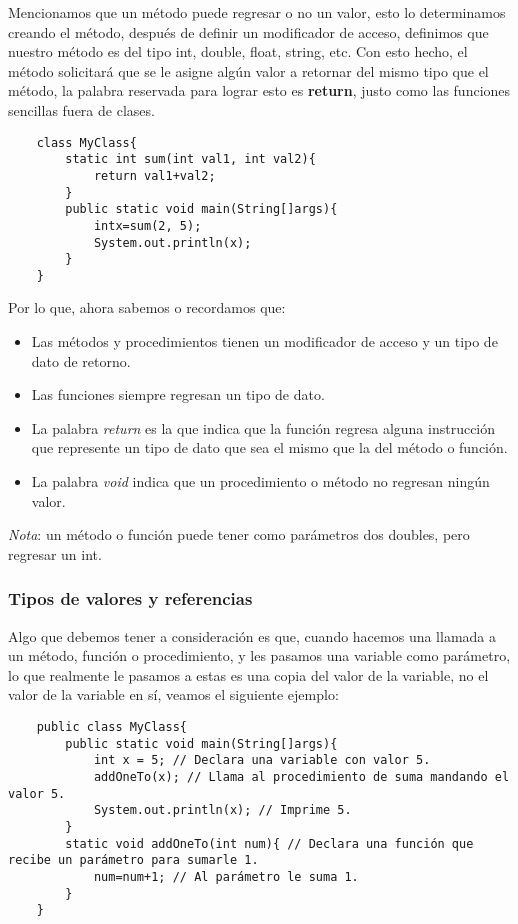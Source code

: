 Mencionamos que un método puede regresar o no un valor, esto lo determinamos creando el método, después de definir un modificador de acceso, definimos que nuestro método es del tipo int, double, float, string, etc. Con esto hecho, el método solicitará que se le asigne algún valor a retornar del mismo tipo que el método, la palabra reservada para lograr esto es \textbf{return}, justo como las funciones sencillas fuera de clases.
\begin{lstlisting}
    class MyClass{
        static int sum(int val1, int val2){
            return val1+val2;
        }
        public static void main(String[]args){
            intx=sum(2, 5);
            System.out.println(x);
        }
    }
\end{lstlisting}

Por lo que, ahora sabemos o recordamos que:
\begin{itemize}
    \item Las métodos y procedimientos tienen un modificador de acceso y un tipo de dato de retorno.
    \item Las funciones siempre regresan un tipo de dato.
    \item La palabra \textit{return} es la que indica que la función regresa alguna instrucción que represente un tipo de dato que sea el mismo que la del método o función.
    \item La palabra \textit{void} indica que un procedimiento o método no regresan ningún valor.
\end{itemize}

\textit{Nota}: un método o función puede tener como parámetros dos doubles, pero regresar un int.


\subsubsection{Tipos de valores y referencias}

Algo que debemos tener a consideración es que, cuando hacemos una llamada a un método, función o procedimiento, y les pasamos una variable como parámetro, lo que realmente le pasamos a estas es una copia del valor de la variable, no el valor de la variable en sí, veamos el siguiente ejemplo:
\begin{lstlisting}
    public class MyClass{
        public static void main(String[]args){
            int x = 5; // Declara una variable con valor 5.
            addOneTo(x); // Llama al procedimiento de suma mandando el valor 5.
            System.out.println(x); // Imprime 5.
        }
        static void addOneTo(int num){ // Declara una función que recibe un parámetro para sumarle 1.
            num=num+1; // Al parámetro le suma 1.
        }
    }
\end{lstlisting}

